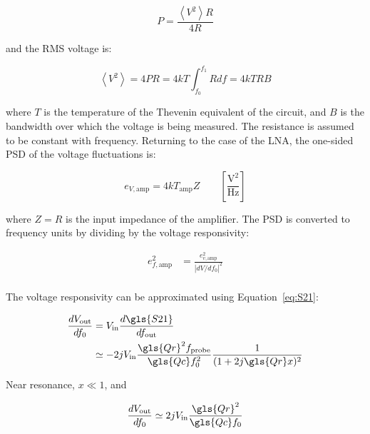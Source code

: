 \begin{equation}
 P = \frac{\left<V^{2}\right>R}{4R}
\end{equation}

and the RMS voltage is:

\begin{equation}
  \left<V^{2}\right> = 4PR = 4kT\int_{f_{0}}^{f_{1}} R df = 4kTRB
\end{equation}

where $T$ is the temperature of the Thevenin equivalent of the circuit, and $B$ is the bandwidth over which the voltage is being measured. The resistance is assumed to be constant with frequency. Returning to the case of the LNA, the one-sided PSD of the voltage fluctuations is:

\begin{equation} \label{eq: johnson noise}
   e_{V,\mathrm{amp}} = 4kT_{\mathrm{amp}}Z \qquad  \left[ \frac{\mathrm{V}^{2}}{\mathrm{Hz}} \right]
\end{equation}

where $Z = R$ is the input impedance of the amplifier. The PSD is converted to frequency units by dividing by the voltage responsivity:

\begin{equation} \label{eq:ef amp}
  \begin{aligned}
  e_{f,\mathrm{amp}}^{2} &= \frac{e_{v,\mathrm{amp}}^{2}}{\left| dV/df_{0} \right|^{2}} \\
  \end{aligned}
\end{equation}

The voltage responsivity can be approximated using Equation~\ref{eq:S21}:

\begin{equation}
  \begin{aligned}
  \frac{dV_{\mathrm{out}}}{df_{0}} &= V_{\mathrm{in}}\frac{d\gls{S21}}{df_{\mathrm{out}}} \\
                         &\simeq -2jV_{\mathrm{in}}\frac{\gls{Qr}^{2}f_{\mathrm{probe}}}{\gls{Qc}f_{0}^{2}}\frac{1}{(1 + 2j\gls{Qr}x)^{2}}
  \end{aligned}
 \end{equation}

Near resonance, $x \ll 1$, and

\begin{equation}
  \frac{dV_{\mathrm{out}}}{df_{0}} \simeq 2jV_{\mathrm{in}}\frac{\gls{Qr}^{2}}{\gls{Qc}f_{0}}
\end{equation}

